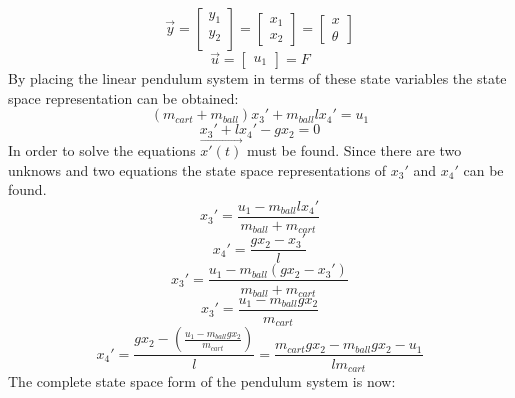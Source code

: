 \documentclass[12pt]{article} %
\begin{document}
\begin{equation}
\vec{y} = 
\begin{bmatrix}
y_1 \\
y_2 \\
\end{bmatrix}
=
\begin{bmatrix}
x_1 \\
x_2
\end{bmatrix}
=
\begin{bmatrix}
x \\
\theta
\end{bmatrix}
\end{equation}
\begin{equation}
\vec{u} = 
\begin{bmatrix}
u_1 
\end{bmatrix}
= F
\end{equation}
By placing the linear pendulum system in terms of these state variables the state space representation can be obtained:
\begin{equation}
(m_{cart} + m_{ball})x_3' + m_{ball}lx_4' = u_1
\end{equation}
\begin{equation}
x_3' + lx_4' - gx_2 = 0
\end{equation}
In order to solve the equations $\vec{x'(t)}$ must be found. Since there are two unknows and two equations the state space representations of $x_3'$ and $x_4'$ can be found. 
\begin{equation}
x_3' = \frac{u_1 - m_{ball}lx_4'}{m_{ball} + m_{cart}}
\end{equation}
\begin{equation}
x_4' = \frac{gx_2 - x_3'}{l}
\end{equation}
\begin{equation}
x_3' = \frac{u_1 - m_{ball}(gx_2 - x_3')}{m_{ball} + m_{cart}}
\end{equation}
\begin{equation}
x_3' = \frac{u_1 - m_{ball}gx_2}{m_{cart}}
\end{equation}
\begin{equation}
x_4' = \frac{gx_2 - (\frac{u_1 - m_{ball}gx_2}{m_{cart}})}{l} = \frac{m_{cart}gx_2 - m_{ball}gx_2 - u_1}{lm_{cart}}
\end{equation}
The complete state space form of the pendulum system is now:
\end{document}
